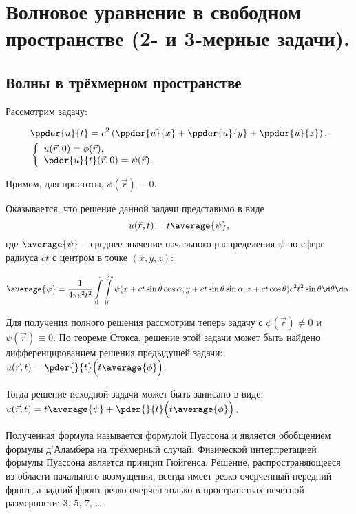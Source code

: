 \chapter{Волновое уравнение в свободном пространстве (2- и 3-мерные задачи).}

\section{Волны в трёхмерном пространстве}
Рассмотрим задачу:

\begin{minipage}{.33\textwidth}
    \begin{align*}
        & \ppder{u}{t} =
        c^2\left(\ppder{u}{x} + \ppder{u}{y} + \ppder{u}{z}\right), \\
        & \left\{ \begin{array}{l}
            u(\vec{r}, 0) = \phi(\vec{r}), \\
            \ds \pder{u}{t}(\vec{r}, 0) = \psi(\vec{r}).
        \end{array} \right.
    \end{align*}
\end{minipage}
\hfill
\begin{minipage}{.6\textwidth}
    Примем, для простоты, \( \phi(\vec{r}) \equiv 0 \).
    
    Оказывается, что решение данной задачи представимо в виде
    \[
        u(\vec{r}, t) = t\average{\psi},
    \]
    где \( \average{\psi} \) -- среднее значение начального распределения
    \( \psi \) по сфере радиуса \( ct \) с центром в точке \( (x, y, z) \):
\end{minipage}
\[
    \average{\psi} = \frac{1}{4\pi c^2t^2} \int\limits_0^\pi
    \int\limits_0^{2\pi} \psi(x + ct\sin\theta\cos\alpha, y + ct\sin\theta
    \sin\alpha, z + ct\cos\theta)c^2t^2\sin\theta\d\theta\d\alpha.
\]

Для получения полного решения рассмотрим теперь задачу с
\( \phi(\vec{r}) \neq 0 \) и \( \psi(\vec{r}) \equiv 0 \). По теореме Стокса,
решение этой задачи может быть найдено дифференцированием решения предыдущей
задачи: \( \ds u(\vec{r}, t) = \pder{}{t}\Bigl(t\average{\phi}\Bigr) \).

Тогда решение исходной задачи может быть записано в виде:
\( \ds u(\vec{r}, t) = t\average{\psi} + \pder{}{t}\Bigl(t\average{\phi}\Bigr) \).

Полученная формула называется формулой Пуассона и является обобщением формулы
д'Аламбера на трёхмерный случай. Физической интерпретацией формулы Пуассона
является принцип Гюйгенса. Решение, распространяющееся из области начального
возмущения, всегда имеет резко очерченный передний фронт, а задний фронт резко
очерчен только в пространствах нечетной размерности: 3, 5, 7, \ldots


